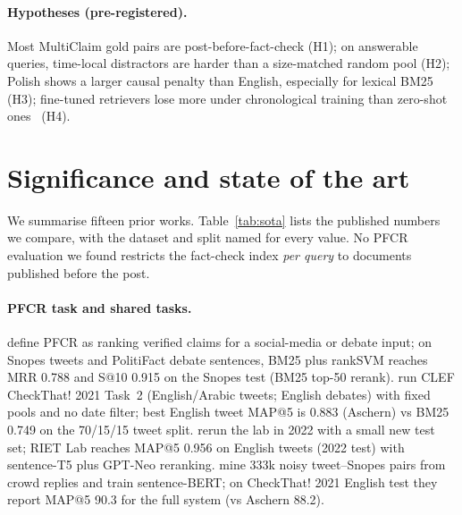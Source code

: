 \documentclass[11pt]{article}
\begin{document}
\paragraph{Hypotheses (pre-registered).}
Most MultiClaim gold pairs are post-before-fact-check (H1); on answerable queries, time-local distractors are harder than a size-matched random pool (H2); Polish shows a larger causal penalty than English, especially for lexical BM25 (H3); fine-tuned retrievers lose more under chronological training than zero-shot ones~\cite{shaar2022role} (H4).

\section{Significance and state of the art}
\label{sec:sota}
We summarise fifteen prior works.
Table~\ref{tab:sota} lists the published numbers we compare, with the dataset and split named for every value.
No PFCR evaluation we found restricts the fact-check index \emph{per query} to documents published before the post.

\paragraph{PFCR task and shared tasks.}
\cite{shaar2020that} define PFCR as ranking verified claims for a social-media or debate input; on Snopes tweets and PolitiFact debate sentences, BM25 plus rankSVM reaches MRR 0.788 and S@10 0.915 on the Snopes test (BM25 top-50 rerank).
\cite{shaar2021overview} run CLEF CheckThat! 2021 Task~2 (English/Arabic tweets; English debates) with fixed pools and no date filter; best English tweet MAP@5 is 0.883 (Aschern) vs BM25 0.749 on the 70/15/15 tweet split.
\cite{nakov2022overview} rerun the lab in 2022 with a small new test set; RIET Lab reaches MAP@5 0.956 on English tweets (2022 test) with sentence-T5 plus GPT-Neo reranking.
\cite{hardalov2022crowdchecked} mine 333k noisy tweet--Snopes pairs from crowd replies and train sentence-BERT; on CheckThat! 2021 English test they report MAP@5 90.3 for the full system (vs Aschern 88.2).
\end{document}
